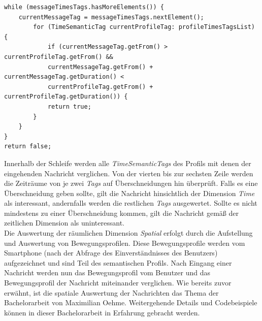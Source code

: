 \lstset{language=Java, caption=Auswertung der Time-Dimension (Auszug), label=DescriptiveLabel, numbers=left, numbersep=1em, breaklines=true, basicstyle=\small}
\begin{lstlisting}
while (messageTimesTags.hasMoreElements()) {
	currentMessageTag = messageTimesTags.nextElement();
		for (TimeSemanticTag currentProfileTag: profileTimesTagsList) {
			if (currentMessageTag.getFrom() > currentProfileTag.getFrom() &&
			currentMessageTag.getFrom() + currentMessageTag.getDuration() <
			currentProfileTag.getFrom() + currentProfileTag.getDuration()) {
			return true;
		}
	}
}
return false;
\end{lstlisting}
Innerhalb der Schleife werden alle \textit{TimeSemanticTags} des Profils mit denen der eingehenden Nachricht verglichen. Von der vierten bis zur sechsten Zeile werden die Zeiträume von je zwei \textit{Tags} auf Überschneidungen hin überprüft. Falls es eine Überschneidung geben sollte, gilt die Nachricht hinsichtlich der Dimension \textit{Time} als interessant, andernfalls werden die restlichen \textit{Tags} ausgewertet. Sollte es nicht mindestens zu einer Überschneidung kommen, gilt die Nachricht gemäß der zeitlichen Dimension als uninteressant.
\\Die Auswertung der räumlichen Dimension \textit{Spatial} erfolgt durch die Aufstellung und Auswertung von Bewegungsprofilen. Diese Bewegungsprofile werden vom Smartphone (nach der Abfrage des Einverständnisses des Benutzers) aufgezeichnet und sind Teil des semantischen Profils. Nach Eingang einer Nachricht werden nun das Bewegungsprofil vom Benutzer und das Bewegungsprofil der Nachricht miteinander verglichen. Wie bereits zuvor erwähnt, ist die spatiale Auswertung der Nachrichten das Thema der Bachelorarbeit von Maximilian Oehme. Weitergehende Details und Codebeispiele können in dieser Bachelorarbeit in Erfahrung gebracht werden.

